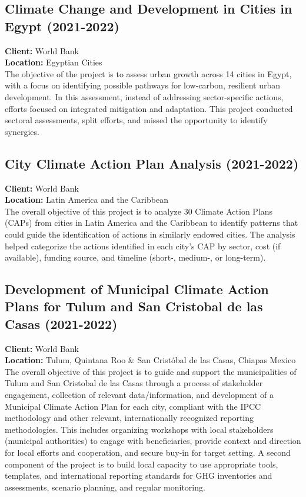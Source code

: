 \documentclass[
	a4paper,
	12pt,
	unnumberedsections,
]{CSSullivanBusinessReport}
\begin{document}
\subsection{Climate Change and Development in Cities in Egypt (2021-2022)}
\textbf{Client:}  World Bank \\
\textbf{Location:}  Egyptian Cities \\[0.5em]
 The objective of the project is to assess urban growth across 14 cities in Egypt, with a focus on identifying possible pathways for low-carbon, resilient urban development. In this assessment, instead of addressing sector-specific actions, efforts focused on integrated mitigation and adaptation. This project conducted sectoral assessments, split efforts, and missed the opportunity to identify synergies.

\subsection{City Climate Action Plan Analysis (2021-2022)}
\textbf{Client:}  World Bank \\
\textbf{Location:}  Latin America and the Caribbean \\[0.5em]
 The overall objective of this project is to analyze 30 Climate Action Plans (CAPs) from cities in Latin America and the Caribbean to identify patterns that could guide the identification of actions in similarly endowed cities. The analysis helped categorize the actions identified in each city’s CAP by sector, cost (if available), funding source, and timeline (short-, medium-, or long-term).

\subsection{Development of Municipal Climate Action Plans for Tulum and San Cristobal de las Casas (2021-2022)}
\textbf{Client:}  World Bank \\
\textbf{Location:}  Tulum, Quintana Roo \& San Cristóbal de las Casas, Chiapas Mexico \\[0.5em]
 The overall objective of this project is to guide and support the municipalities of Tulum and San Cristobal de las Casas through a process of stakeholder engagement, collection of relevant data/information, and development of a Municipal Climate Action Plan for each city, compliant with the IPCC methodology and other relevant, internationally recognized reporting methodologies. This includes organizing workshops with local stakeholders (municipal authorities) to engage with beneficiaries, provide context and direction for local efforts and cooperation, and secure buy-in for target setting. A second component of the project is to build local capacity to use appropriate tools, templates, and international reporting standards for GHG inventories and assessments, scenario planning, and regular monitoring.
\end{document}
